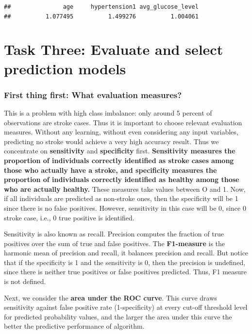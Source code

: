 \documentclass[
]{article}
\begin{document}
\begin{verbatim}
##               age     hypertension1 avg_glucose_level 
##          1.077495          1.499276          1.004061
\end{verbatim}

\section{Task Three: Evaluate and select prediction
models}\label{task-three-evaluate-and-select-prediction-models}

\subsubsection{\texorpdfstring{\textbf{First thing first: What
evaluation
measures?}}{First thing first: What evaluation measures?}}\label{first-thing-first-what-evaluation-measures}

This is a problem with high class imbalance: only around 5 percent of
observations are stroke cases. Thus it is important to choose relevant
evaluation measures. Without any learning, without even considering any
input variables, predicting no stroke would achieve a very high accuracy
result. Thus we concentrate on \textbf{sensitivity} and
\textbf{specificity} first. \textbf{Sensitivity measures the proportion
of individuals correctly identified as stroke cases among those who
actually have a stroke, and specificity measures the proportion of
individuals correctly identified as healthy among those who are actually
healthy.} These measures take values between O and 1. Now, if all
individuals are predicted as non-stroke ones, then the specificity will
be 1 since there is no false positives. However, sensitivity in this
case will be 0, since 0 stroke case, i.e., 0 true positive is
identified.

Sensitivity is also known as recall. Precision computes the fraction of
true positives over the sum of true and false positives. The
\textbf{F1-measure} is the harmonic mean of precision and recall, it
balances precision and recall. But notice that if the specificity is 1
and the sensitivity is 0, then the precision is undefined, since there
is neither true positives or false positives predicted. Thus, F1 measure
is not defined.

Next, we consider the \textbf{area under the ROC curve}. This curve
draws sensitivity against false positive rate (1-specificity) at every
cut-off threshold level for predicted probability values, and the larger
the area under this curve the better the predictive performance of
algorithm.
\end{document}
